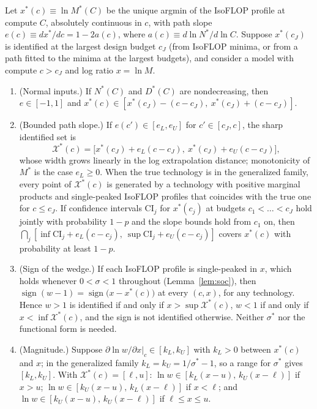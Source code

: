 \begin{proposition}\label{prop:A-pi}
Let $x^*(c)\equiv\ln M^*(C)$ be the unique argmin of the IsoFLOP profile at compute $C$, absolutely continuous in $c$, with
path slope $e(c)\equiv dx^*/dc=1-2a(c)$, where $a(c)\equiv d\ln N^*/d\ln C$. Suppose $x^*(c_J)$ is identified at the largest
design budget $c_J$ (from IsoFLOP minima, or from a path fitted to the minima at the largest budgets), and consider a model
with compute $c>c_J$ and log ratio $x=\ln M$.
\begin{enumerate}
\item[(i)] (Normal inputs.) If $N^*(C)$ and $D^*(C)$ are nondecreasing, then $e\in[-1,1]$ and
$x^*(c)\in[x^*(c_J)-(c-c_J),\ x^*(c_J)+(c-c_J)]$.
\item[(ii)] (Bounded path slope.) If $e(c')\in[e_L,e_U]$ for $c'\in[c_J,c]$, the sharp identified set is
\[
\mathcal X^*(c)=\big[x^*(c_J)+e_L(c-c_J),\ x^*(c_J)+e_U(c-c_J)\big],
\]
whose width grows linearly in the log extrapolation distance; monotonicity of $M^*$ is the case $e_L\ge0$. When the true
technology is in the generalized family, every point of $\mathcal X^*(c)$ is generated by a technology with positive
marginal products and single-peaked IsoFLOP profiles that coincides with the true one for $c\le c_J$. If confidence
intervals $\mathrm{CI}_j$ for $x^*(c_j)$ at budgets $c_1<\dots<c_J$ hold jointly with probability $1-p$ and the slope bounds
hold from $c_1$ on, then $\bigcap_j[\inf\mathrm{CI}_j+e_L(c-c_j),\ \sup\mathrm{CI}_j+e_U(c-c_j)]$ covers $x^*(c)$ with
probability at least $1-p$.
\item[(iii)] (Sign of the wedge.) If each IsoFLOP profile is single-peaked in $x$, which holds whenever $0<\sigma<1$
throughout (Lemma~\ref{lem:soc}), then $\operatorname{sign}(w-1)=\operatorname{sign}\big(x-x^*(c)\big)$ at every $(c,x)$, for
any technology. Hence $w>1$ is identified if and only if $x>\sup\mathcal X^*(c)$, $w<1$ if and only if
$x<\inf\mathcal X^*(c)$, and the sign is not identified otherwise. Neither $\sigma^*$ nor the functional form is needed.
\item[(iv)] (Magnitude.) Suppose $\partial\ln w/\partial x|_c\in[k_L,k_U]$ with $k_L>0$ between $x^*(c)$ and $x$; in the
generalized family $k_L=k_U=1/\sigma^*-1$, so a range for $\sigma^*$ gives $[k_L,k_U]$. With
$\mathcal X^*(c)=[\ell,u]$: $\ln w\in[k_L(x-u),\,k_U(x-\ell)]$ if $x>u$; $\ln w\in[k_U(x-u),\,k_L(x-\ell)]$ if $x<\ell$; and
$\ln w\in[k_U(x-u),\,k_U(x-\ell)]$ if $\ell\le x\le u$.

\end{enumerate}
\end{proposition}

